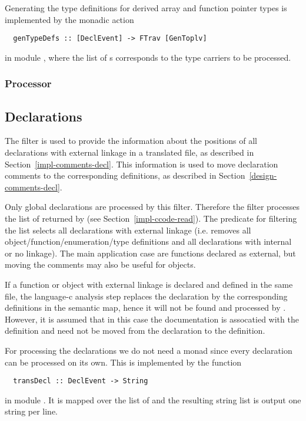 Generating the type definitions for derived array and function pointer types is implemented by the monadic action
\begin{verbatim}
  genTypeDefs :: [DeclEvent] -> FTrav [GenToplv]
\end{verbatim}
in module , where the list of s corresponds to the type carriers
to be processed.

\subsubsection{Processor }

\subsection{Declarations}
\label{impl-ccomps-decls}

The filter  is used to provide the information about the positions of all declarations with
external linkage in
a translated file, as described in Section~\ref{impl-comments-decl}. This information is used to move declaration
comments to the corresponding definitions, as described in Section~\ref{design-comments-decl}.

Only global declarations are processed by this filter. Therefore the filter processes the list of 
returned by  (see Section~\ref{impl-ccode-read}). The predicate for filtering the list
selects all declarations with external linkage (i.e. removes all object/function/enumeration/type definitions and 
all declarations with internal or no linkage). 
The main application case are functions declared as external, but moving the comments may also be useful for 
objects.

If a function or object with external linkage is declared and defined in the same file, the language-c analysis step
replaces the declaration by the corresponding definitions in the semantic map, hence it will not be found and processed
by . However, it is assumed that in this case the documentation is assocatied with the definition
and need not be moved from the declaration to the definition.

For processing the declarations we do not need a monad since every declaration can be processed on its own. This is implemented
by the function
\begin{verbatim}
  transDecl :: DeclEvent -> String
\end{verbatim}
in module . It is mapped over the list of  and the resulting string list
is output one string per line.

